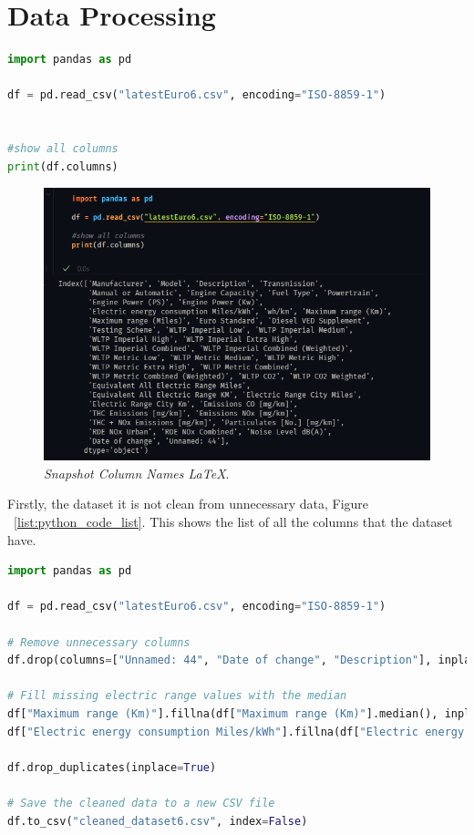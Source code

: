  


\section{Data Processing}
\begin{lstlisting}[language=Python, caption={Code snippet in \LaTeX ~and  this is a Python code }, label=list:python_code_ex]
import pandas as pd

df = pd.read_csv("latestEuro6.csv", encoding="ISO-8859-1")


#show all columns
print(df.columns)
\end{lstlisting}
\begin{figure}[H]
    \centering
    \includegraphics[scale=0.85]{figures/ColumnNames.png}
    \caption{\textit{Snapshot Column Names \LaTeX}.}
    \label{fig:chart_1}
\end{figure}

Firstly, the dataset it is not clean from unnecessary data, Figure ~\ref{list:python_code_list}. This shows the list of all the columns that the dataset have.

\begin{lstlisting}[language=Python, caption={Code snippet in \LaTeX ~and  this is a Python code, removind unnesesary data }, label=list:python_code_list]
import pandas as pd

df = pd.read_csv("latestEuro6.csv", encoding="ISO-8859-1")

# Remove unnecessary columns
df.drop(columns=["Unnamed: 44", "Date of change", "Description"], inplace=True)

# Fill missing electric range values with the median
df["Maximum range (Km)"].fillna(df["Maximum range (Km)"].median(), inplace=True)
df["Electric energy consumption Miles/kWh"].fillna(df["Electric energy consumption Miles/kWh"].median(), inplace=True)

df.drop_duplicates(inplace=True)

# Save the cleaned data to a new CSV file
df.to_csv("cleaned_dataset6.csv", index=False)

\end{lstlisting}

